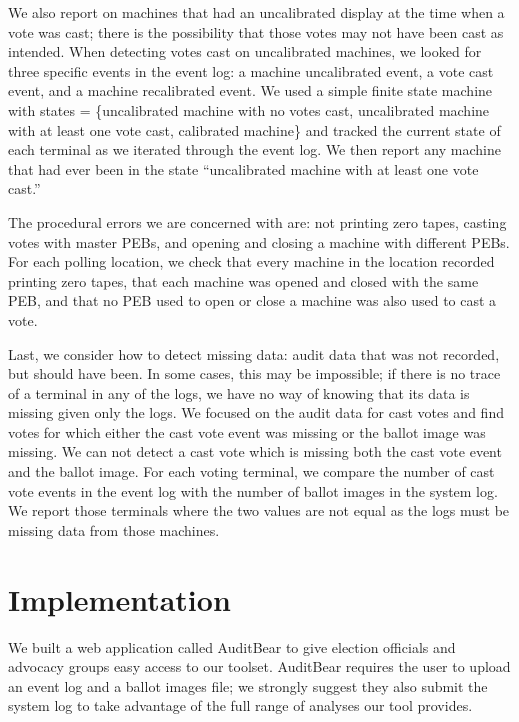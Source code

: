 \documentclass[letterpaper,twocolumn,10pt]{article}
\begin{document}

We also report on machines that had an uncalibrated display at the time when a
vote was cast; there is the possibility that those votes may not have been cast
as intended. When detecting votes cast on uncalibrated machines, we looked for
three specific events in the event log: a machine uncalibrated event, a vote
cast event, and a machine recalibrated event. We used a simple finite state
machine with states = \{uncalibrated machine with no votes cast, uncalibrated
  machine with at least one vote cast, calibrated machine\} and tracked the
current state of each terminal as we iterated through the event log. We then
report any machine that had ever been in the state ``uncalibrated machine with
at least one vote cast.'' 

The procedural errors we are concerned with are: not printing zero tapes,
casting votes with master PEBs, and opening and closing a machine with
different PEBs. For each polling location, we check that every machine in the
location recorded printing zero tapes, that each machine was opened and closed
with the same PEB, and that no PEB used to open or close a machine was also used
to cast a vote.  

Last, we consider how to detect missing data: audit data that was not recorded,
but should have been. In some cases, this may be impossible; if there is no
trace of a terminal in any of the logs, we have no way of knowing that its data
is missing given only the logs. We focused on the audit data for cast votes and
find votes for which either the cast vote event was missing or the ballot image
was missing. We can not detect a cast vote which is missing both the cast vote
event and the ballot image. For each voting terminal, we compare the number of
cast vote events in the event log with the number of ballot images in the system
log. We report those terminals where the two values are not equal as the logs
must be missing data from those machines.  

\section{Implementation}
We built a web application called AuditBear to give election officials and
advocacy groups easy access to our toolset. AuditBear requires the user to
upload an event log and a ballot images file; we strongly suggest they also
submit the system log to take advantage of the full range of analyses our tool
provides. 
\end{document}
